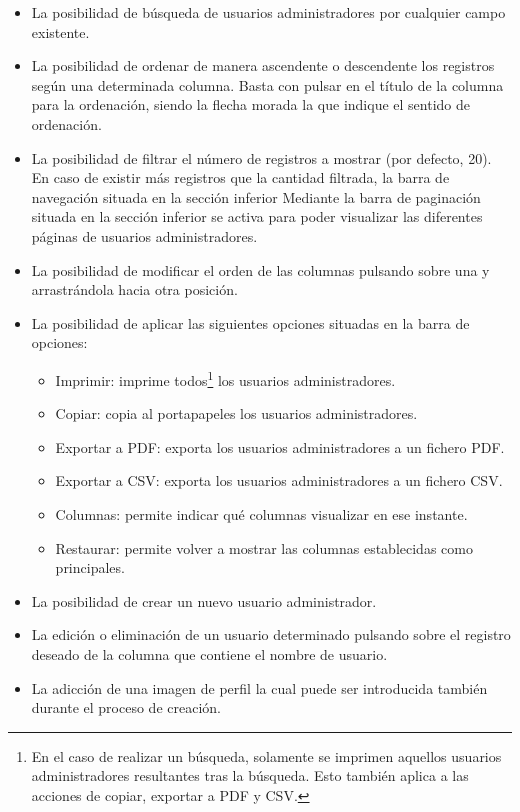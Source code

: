 \documentclass[12pt,a4paper, twoside]{report}
\begin{document}
\begin{itemize}
\begin{itemize}
			\item La posibilidad de búsqueda de usuarios administradores por cualquier campo existente.
		 	\item La posibilidad de ordenar de manera ascendente o descendente los registros según una determinada columna. Basta con pulsar en el título de la columna para la ordenación, siendo la flecha morada la que indique el sentido de ordenación.
			\item La posibilidad de filtrar el número de registros a mostrar (por defecto, 20). En caso de existir más registros que la cantidad filtrada, la barra de navegación situada en la sección inferior Mediante la barra de paginación situada en la sección inferior se activa para poder visualizar las diferentes páginas de usuarios administradores.
			\item La posibilidad de modificar el orden de las columnas pulsando sobre una y arrastrándola hacia otra posición. 
			\item La posibilidad de aplicar las siguientes opciones situadas en la barra de opciones:
				\begin{itemize}
					\item Imprimir: imprime todos\footnote{En el caso de realizar un búsqueda, solamente se imprimen aquellos usuarios administradores resultantes tras la búsqueda. Esto también aplica a las acciones de copiar, exportar a PDF y CSV.} los usuarios administradores.
					\item Copiar: copia al portapapeles los usuarios administradores.
					\item Exportar a PDF: exporta los usuarios administradores a un fichero PDF.
					\item Exportar a CSV: exporta los usuarios administradores a un fichero CSV.
					\item Columnas: permite indicar qué columnas visualizar en ese instante.
					\item Restaurar: permite volver a mostrar las columnas establecidas como principales.
				\end{itemize}
			\item La posibilidad de crear un nuevo usuario administrador.
			\item La edición o eliminación de un usuario determinado pulsando sobre el registro deseado de la columna que contiene el nombre de usuario.
			\item La adicción de una imagen de perfil la cual puede ser introducida también durante el proceso de creación.
		\end{itemize}
		

\end{itemize}
\end{document}
